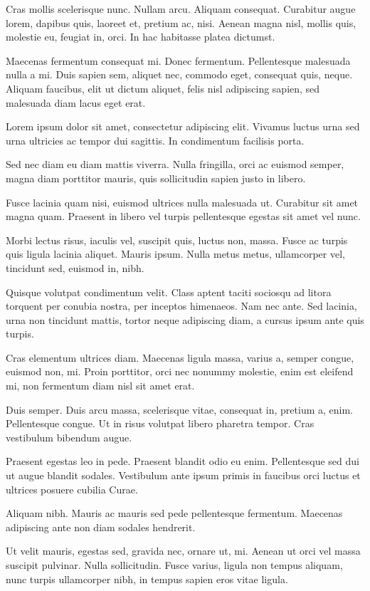 Cras mollis scelerisque nunc. Nullam arcu. Aliquam consequat. Curabitur augue lorem, dapibus quis, laoreet et, pretium ac, nisi. Aenean magna nisl, mollis quis, molestie eu, feugiat in, orci. In hac habitasse platea dictumst.

Maecenas fermentum consequat mi. Donec fermentum. Pellentesque malesuada nulla a mi. Duis sapien sem, aliquet nec, commodo eget, consequat quis, neque. Aliquam faucibus, elit ut dictum aliquet, felis nisl adipiscing sapien, sed malesuada diam lacus eget erat.

Lorem ipsum dolor sit amet, consectetur adipiscing elit. Vivamus luctus urna sed urna ultricies ac tempor dui sagittis. In condimentum facilisis porta.

Sed nec diam eu diam mattis viverra. Nulla fringilla, orci ac euismod semper, magna diam porttitor mauris, quis sollicitudin sapien justo in libero.

Fusce lacinia quam nisi, euismod ultrices nulla malesuada ut. Curabitur sit amet magna quam. Praesent in libero vel turpis pellentesque egestas sit amet vel nunc.

Morbi lectus risus, iaculis vel, suscipit quis, luctus non, massa. Fusce ac turpis quis ligula lacinia aliquet. Mauris ipsum. Nulla metus metus, ullamcorper vel, tincidunt sed, euismod in, nibh.

Quisque volutpat condimentum velit. Class aptent taciti sociosqu ad litora torquent per conubia nostra, per inceptos himenaeos. Nam nec ante. Sed lacinia, urna non tincidunt mattis, tortor neque adipiscing diam, a cursus ipsum ante quis turpis.

Cras elementum ultrices diam. Maecenas ligula massa, varius a, semper congue, euismod non, mi. Proin porttitor, orci nec nonummy molestie, enim est eleifend mi, non fermentum diam nisl sit amet erat.

Duis semper. Duis arcu massa, scelerisque vitae, consequat in, pretium a, enim. Pellentesque congue. Ut in risus volutpat libero pharetra tempor. Cras vestibulum bibendum augue.

Praesent egestas leo in pede. Praesent blandit odio eu enim. Pellentesque sed dui ut augue blandit sodales. Vestibulum ante ipsum primis in faucibus orci luctus et ultrices posuere cubilia Curae.

Aliquam nibh. Mauris ac mauris sed pede pellentesque fermentum. Maecenas adipiscing ante non diam sodales hendrerit.

Ut velit mauris, egestas sed, gravida nec, ornare ut, mi. Aenean ut orci vel massa suscipit pulvinar. Nulla sollicitudin. Fusce varius, ligula non tempus aliquam, nunc turpis ullamcorper nibh, in tempus sapien eros vitae ligula.

